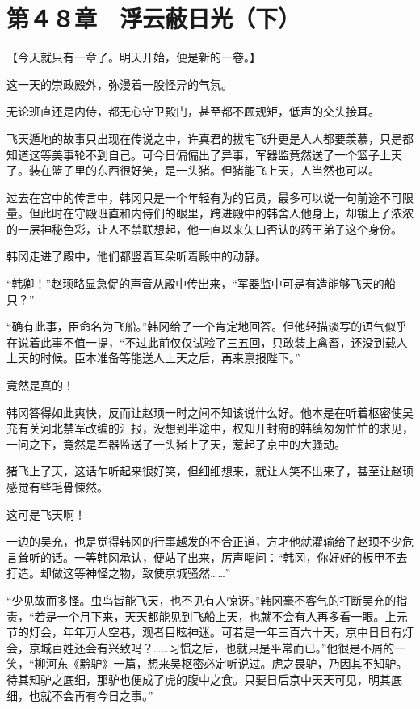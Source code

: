 \section{第４８章　浮云蔽日光（下）}

【今天就只有一章了。明天开始，便是新的一卷。】

这一天的崇政殿外，弥漫着一股怪异的气氛。

无论班直还是内侍，都无心守卫殿门，甚至都不顾规矩，低声的交头接耳。

飞天遁地的故事只出现在传说之中，许真君的拔宅飞升更是人人都要羡慕，只是都知道这等美事轮不到自己。可今日偏偏出了异事，军器监竟然送了一个篮子上天了。装在篮子里的东西很好笑，是一头猪。但猪能飞上天，人当然也可以。

过去在宫中的传言中，韩冈只是一个年轻有为的官员，最多可以说一句前途不可限量。但此时在守殿班直和内侍们的眼里，跨进殿中的韩舍人他身上，却镀上了浓浓的一层神秘色彩，让人不禁联想起，他一直以来矢口否认的药王弟子这个身份。

韩冈走进了殿中，他们都竖着耳朵听着殿中的动静。

“韩卿！”赵顼略显急促的声音从殿中传出来，“军器监中可是有造能够飞天的船只？”

“确有此事，臣命名为飞船。”韩冈给了一个肯定地回答。但他轻描淡写的语气似乎在说着此事不值一提，“不过此前仅仅试验了三五回，只敢装上禽畜，还没到载人上天的时候。臣本准备等能送人上天之后，再来禀报陛下。”

竟然是真的！

韩冈答得如此爽快，反而让赵顼一时之间不知该说什么好。他本是在听着枢密使吴充有关河北禁军改编的汇报，没想到半途中，权知开封府的韩缜匆匆忙忙的求见，一问之下，竟然是军器监送了一头猪上了天，惹起了京中的大骚动。

猪飞上了天，这话乍听起来很好笑，但细细想来，就让人笑不出来了，甚至让赵顼感觉有些毛骨悚然。

这可是飞天啊！

一边的吴充，也是觉得韩冈的行事越发的不合正道，方才他就灌输给了赵顼不少危言耸听的话。一等韩冈承认，便站了出来，厉声喝问：“韩冈，你好好的板甲不去打造。却做这等神怪之物，致使京城骚然……”

“少见故而多怪。虫鸟皆能飞天，也不见有人惊讶。”韩冈毫不客气的打断吴充的指责，“若是一个月下来，天天都能见到飞船上天，也就不会有人再多看一眼。上元节的灯会，年年万人空巷，观者目眩神迷。可若是一年三百六十天，京中日日有灯会，京城百姓还会有兴致吗？……习惯之后，也就只是平常而已。”他很是不屑的一笑，“柳河东《黔驴》一篇，想来吴枢密必定听说过。虎之畏驴，乃因其不知驴。待其知驴之底细，那驴也便成了虎的腹中之食。只要日后京中天天可见，明其底细，也就不会再有今日之事。”

